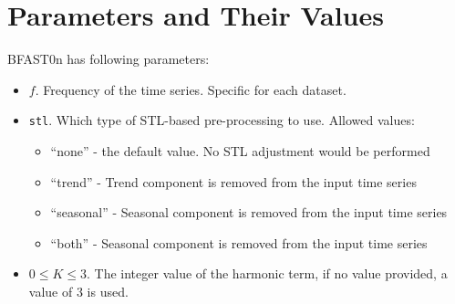 \documentclass[main.tex]{subfiles}
\begin{document}
\section{Parameters and Their Values}
\label{sec:bfast0n_params}
BFAST0n has following parameters:
\begin{itemize}
\item $f$. Frequency of the time series. Specific for each dataset.
\item \texttt{stl}. Which type of STL-based pre-processing to use.
  Allowed values:
  \begin{itemize}
  \item ``none'' - the default value. No STL adjustment would be performed
  \item ``trend'' - Trend component is removed from the input time series
  \item ``seasonal'' - Seasonal component is removed from the input time series
  \item ``both'' - Seasonal component is removed from the input time series
  \end{itemize}
\item $0 \leq K \leq 3$. The integer value of the harmonic term, if no value
  provided, a value of $3$ is used.
\end{itemize}
\biblio
\end{document}
